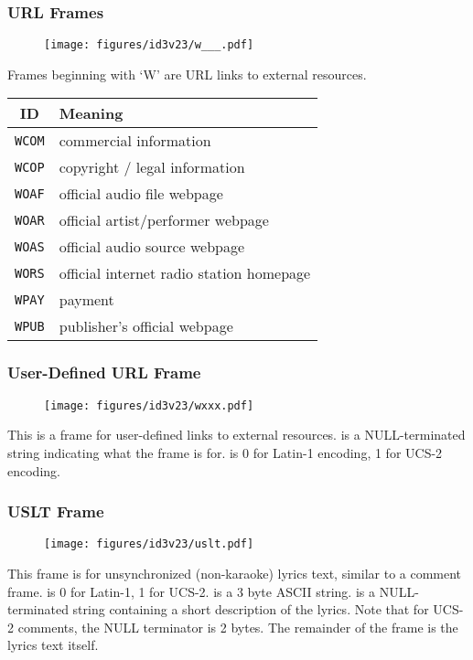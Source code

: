 \clearpage

\subsubsection{URL Frames}
\begin{figure}[h]
\texttt{[image: figures/id3v23/w\_\_\_.pdf]}
\end{figure}
\par
\noindent
Frames beginning with `W' are URL links to external resources.
\par
\begin{table}[h]
\begin{tabular}{|c|l|}
\hline
ID & Meaning \\
\hline
\texttt{WCOM} & commercial information \\
\texttt{WCOP} & copyright / legal information \\
\texttt{WOAF} & official audio file webpage \\
\texttt{WOAR} & official artist/performer webpage \\
\texttt{WOAS} & official audio source webpage \\
\texttt{WORS} & official internet radio station homepage \\
\texttt{WPAY} & payment \\
\texttt{WPUB} & publisher's official webpage \\
\hline
\end{tabular}
\end{table}

\subsubsection{User-Defined URL Frame}

\begin{figure}[h]
\texttt{[image: figures/id3v23/wxxx.pdf]}
\end{figure}
\par
\noindent
This is a frame for user-defined links to external resources.
 is a NULL-terminated string indicating
what the frame is for.
 is 0 for Latin-1 encoding, 1 for UCS-2 encoding.

\clearpage

\subsubsection{USLT Frame}
\begin{figure}[h]
  \texttt{[image: figures/id3v23/uslt.pdf]}
\end{figure}
\par
\noindent
This frame is for unsynchronized (non-karaoke) lyrics text,
similar to a comment frame.
 is 0 for Latin-1, 1 for UCS-2.
 is a 3 byte ASCII string.
 is a NULL-terminated string
containing a short description of the lyrics.
Note that for UCS-2 comments, the NULL terminator is 2 bytes.
The remainder of the frame is the lyrics text itself.

